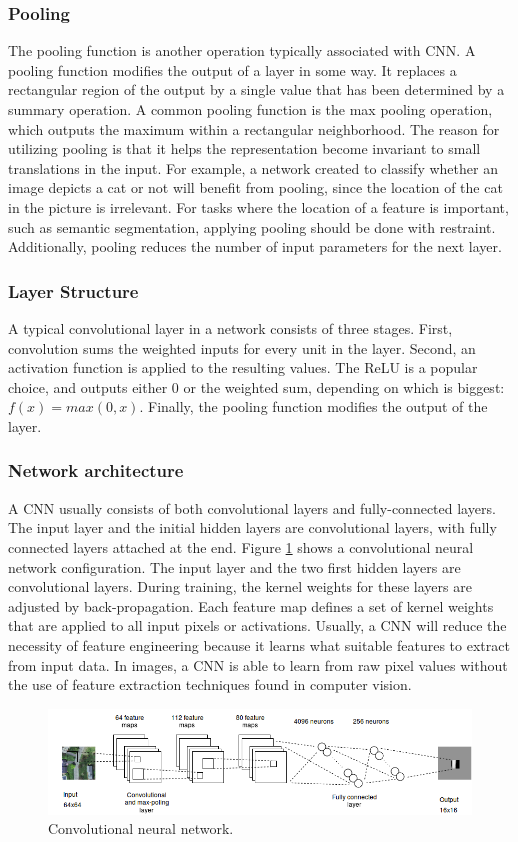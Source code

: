 \subsubsection{Pooling}
The pooling function is another operation typically associated with \ac{CNN}. A pooling function modifies the output of a layer in some way. It replaces a rectangular region of the output by a single value that has been determined by a summary operation. A common pooling function is the max pooling operation, which outputs the maximum within a rectangular neighborhood. The reason for utilizing pooling is that it helps the representation become invariant to small translations in the input. For example, a network created to classify whether an image depicts a cat or not will benefit from pooling, since the location of the cat in the picture is irrelevant. For tasks where the location of a feature is important, such as semantic segmentation, applying pooling should be done with restraint. Additionally, pooling reduces the number of input parameters for the next layer.

\subsubsection{Layer Structure}
A typical convolutional layer in a network consists of three stages. First, convolution sums the weighted inputs for every unit in the layer. Second, an activation function is applied to the resulting values. The \ac{ReLU} is a popular choice, and outputs either 0 or the weighted sum, depending on which is biggest: $f(x) = max(0, x)$. Finally, the pooling function modifies the output of the layer. 

\subsubsection{Network architecture}
A \ac{CNN} usually consists of both convolutional layers and fully-connected layers. The input layer and the initial hidden layers are convolutional layers, with fully connected layers attached at the end. Figure \ref{fig:conv} shows a convolutional neural network configuration. The input layer and the two first hidden layers are convolutional layers. During training, the kernel weights for these layers are adjusted by back-propagation. Each feature map defines a set of kernel weights that are applied to all input pixels or activations. Usually, a \ac{CNN} will reduce the necessity of feature engineering because it learns what suitable features to extract from input data. In images, a \ac{CNN} is able to learn from raw pixel values without the use of feature extraction techniques found in computer vision.


\begin{figure}[t]
\begin{center}
\includegraphics[width=1\columnwidth]{figs/conv_diagram.png}
\caption[Convolutional neural network]{Convolutional neural network. }
\label{fig:conv}
\end{center}
\end{figure}